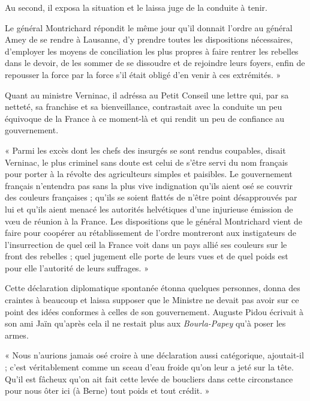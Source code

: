 \documentclass[french,twoside]{book} %
\newenvironment{quoteblock}%
  {\begin{quoting}}
  {\end{quoting}}
\newenvironment{quotebar}{%
    \def\FrameCommand{{\color{rubric!10!}\vrule width 0.5em} \hspace{0.9em}}%
    \def\OuterFrameSep{\itemsep} %
    \MakeFramed {\advance\hsize-\width \FrameRestore}
  }%
  {%
    \endMakeFramed
  }
\renewenvironment{quoteblock}%
  {%
    \savenotes
    \setstretch{0.9}
    \begin{quotebar}
  }
  {%
    \end{quotebar}
    \spewnotes
  }
\begin{document}
\noindent Au second, il exposa la situation et le laissa juge de la conduite à tenir.\par
Le général Montrichard répondit le même jour qu’il donnait l’ordre au général Amey de se rendre à Lausanne, d’y prendre toutes les dispositions nécessaires, d’employer les moyens de conciliation les plus propres à faire rentrer les rebelles dans le devoir, de les sommer de se dissoudre et de rejoindre leurs foyers, enfin de repousser la force par la force s’il était obligé d’en venir à ces extrémités. »\par
Quant au ministre Verninac, il adréssa au Petit Conseil une lettre qui, par sa netteté, sa franchise et sa bienveillance, contrastait avec la conduite un peu équivoque de la France à ce moment-là et qui rendit un peu de confiance au gouvernement.\par

\begin{quoteblock}
 \noindent « Parmi les excès dont les chefs des insurgés se sont rendus coupables, disait Verninac, le plus criminel sans doute est celui de s’être servi du nom français pour porter à la révolte des agriculteurs simples et paisibles. Le gouvernement français n’entendra pas sans la plus vive indignation qu’ils aient osé se couvrir des couleurs françaises ; qu’ils se soient flattés de n’être point désapprouvés par lui et qu’ils aient menacé les autorités helvétiques d’une injurieuse émission de vœu de réunion à la France. Les dispositions que le général Montrichard vient de faire pour coopérer au rétablissement de l’ordre montreront aux instigateurs de l’insurrection de quel œil la France voit dans un pays allié ses couleurs sur le front des rebelles ; quel jugement elle porte de leurs vues et de quel poids est pour elle l’autorité de leurs suffrages. »
 \end{quoteblock}

\noindent Cette déclaration diplomatique spontanée étonna quelques personnes, donna des craintes à beaucoup et laissa supposer que le Ministre ne devait pas avoir sur ce point des idées conformes à celles de son gouvernement. Auguste Pidou écrivait à son ami Jaïn qu’après cela il ne restait plus aux \emph{Bourla-Papey} qu’à poser les armes.\par

\begin{quoteblock}
 \noindent « Nous n’aurions jamais osé croire à une déclaration aussi catégorique, ajoutait-il ; c’est véritablement comme un sceau d’eau froide qu’on leur a jeté sur la tête. Qu’il est fâcheux qu’on ait fait cette levée de boucliers dans cette circonstance pour nous ôter ici (à Berne) tout poids et tout crédit. »
 \end{quoteblock}
\end{document}
